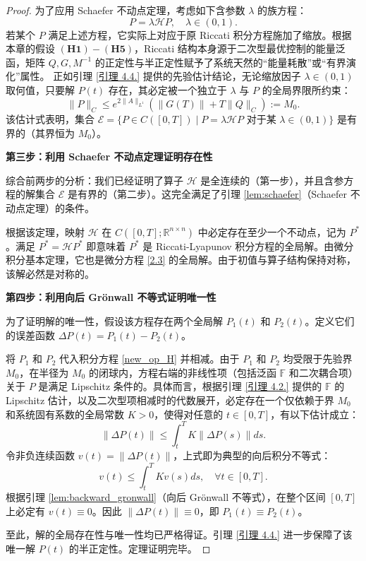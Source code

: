 \documentclass{GZUbachelorthesis}
\begin{document}
\begin{proof}
	为了应用 Schaefer 不动点定理，考虑如下含参数 $\lambda$ 的族方程：
	\begin{equation}\label{lambda_eq}
		P = \lambda \mathcal{H}P, \quad \lambda \in (0,1).
	\end{equation}
	若某个 $P$ 满足上述方程，它实际上对应于原 Riccati 积分方程施加了缩放。根据本章的假设 $\mathbf{(H1)-(H5)}$，Riccati 结构本身源于二次型最优控制的能量泛函，矩阵 $Q, G, M^{-1}$ 的正定性与半正定性赋予了系统天然的“能量耗散”或“有界演化”属性。
	正如引理 \ref{引理 4.4.} 提供的先验估计结论，无论缩放因子 $\lambda \in (0,1)$ 取何值，只要解 $P(t)$ 存在，其必定被一个独立于 $\lambda$ 与 $P$ 的全局界限所约束：
	\begin{equation}\label{apriori_bound}
		\|P\|_C \le e^{2\|A\|_{L^1}} \left( \|G(T)\| + T\|Q\|_C \right) := M_0.
	\end{equation}
	该估计式表明，集合 $\mathcal{E} = \{ P \in C([0,T]) \mid P = \lambda \mathcal{H}P \text{ 对于某 } \lambda \in (0,1) \}$ 是有界的（其界恒为 $M_0$）。
	
	\textbf{第三步：利用 Schaefer 不动点定理证明存在性}
	
	综合前两步的分析：我们已经证明了算子 $\mathcal{H}$ 是全连续的（第一步），并且含参方程的解集合 $\mathcal{E}$ 是有界的（第二步）。这完全满足了引理 \ref{lem:schaefer}（Schaefer 不动点定理）的条件。
	
	根据该定理，映射 $\mathcal{H}$ 在 $C([0,T]; \mathbb{R}^{n\times n})$ 中必定存在至少一个不动点，记为 $P^*$。满足 $P^* = \mathcal{H}P^*$ 即意味着 $P^*$ 是 Riccati-Lyapunov 积分方程的全局解。由微分积分基本定理，它也是微分方程 \eqref{2.3} 的全局解。由于初值与算子结构保持对称，该解必然是对称的。
	
	\textbf{第四步：利用向后 Grönwall 不等式证明唯一性}
	
	为了证明解的唯一性，假设该方程存在两个全局解 $P_1(t)$ 和 $P_2(t)$。定义它们的误差函数 $\Delta P(t) = P_1(t) - P_2(t)$。
	
	将 $P_1$ 和 $P_2$ 代入积分方程 \eqref{new_op_H} 并相减。由于 $P_1$ 和 $P_2$ 均受限于先验界 $M_0$，在半径为 $M_0$ 的闭球内，方程右端的非线性项（包括泛函 $\mathbb{F}$ 和二次耦合项）关于 $P$ 是满足 Lipschitz 条件的。具体而言，根据引理 \ref{引理 4.2.} 提供的 $\mathbb{F}$ 的 Lipschitz 估计，以及二次型项相减时的代数展开，必定存在一个仅依赖于界 $M_0$ 和系统固有系数的全局常数 $K > 0$，使得对任意的 $t \in [0,T]$，有以下估计成立：
	\begin{equation}\label{diff_eq}
		\|\Delta P(t)\| \le \int_t^T K \|\Delta P(s)\| ds.
	\end{equation}
	令非负连续函数 $v(t) = \|\Delta P(t)\|$，上式即为典型的向后积分不等式：
	\begin{equation}
		v(t) \le \int_t^T K v(s) ds, \quad \forall t \in [0,T].
	\end{equation}
	根据引理 \ref{lem:backward_gronwall}（向后 Grönwall 不等式），在整个区间 $[0,T]$ 上必定有 $v(t) \equiv 0$。因此 $\|\Delta P(t)\| \equiv 0$，即 $P_1(t) \equiv P_2(t)$。
	
	至此，解的全局存在性与唯一性均已严格得证。引理 \ref{引理 4.4.} 进一步保障了该唯一解 $P(t)$ 的半正定性。定理证明完毕。
\end{proof}
\end{document}
